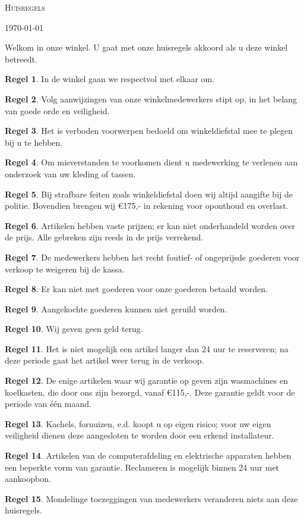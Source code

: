 \documentclass[a4paper,14pt]{extarticle}
\theoremstyle{definition}
\newtheorem{regel}{Regel}
\begin{document}
\thispagestyle{empty}
\centerline{\LARGE\textsc{Huisregels}}
\centerline{\today}
\vskip 1cm
Welkom in onze winkel. 
U gaat met onze huisregels akkoord als u deze winkel betreedt.
\begin{regel}
In de winkel gaan we respectvol met elkaar om.
\end{regel}
\begin{regel}
Volg aanwijzingen van onze winkelmedewerkers stipt op, in het belang van goede orde en veiligheid.
\end{regel}
\begin{regel}
Het is verboden voorwerpen bedoeld om winkeldiefstal mee te plegen bij u te hebben.
\end{regel}
\begin{regel}
Om misverstanden te voorkomen dient u medewerking te verlenen aan onderzoek van uw kleding of tassen.
\end{regel}
\begin{regel}
Bij strafbare feiten zoals winkeldiefstal doen wij altijd aangifte bij de politie. Bovendien brengen wij \euro 175,- in rekening voor oponthoud en overlast. 
\end{regel}
\begin{regel}
Artikelen hebben vaste prijzen; er kan niet onderhandeld worden over de prijs. Alle gebreken zijn reeds in de prijs verrekend.
\end{regel}
\begin{regel}
De medewerkers hebben het recht foutief- of ongeprijsde goederen voor verkoop te weigeren bij de kassa.
\end{regel}
\begin{regel}
Er kan niet met goederen voor onze goederen betaald worden.
\end{regel}
\begin{regel}
Aangekochte goederen kunnen niet geruild worden.
\end{regel}
\begin{regel}
Wij geven geen geld terug.
\end{regel}
\begin{regel}
Het is niet mogelijk een artikel langer dan 24 uur te reserveren; na deze periode gaat het artikel weer terug in de verkoop.
\end{regel}
\begin{regel}
De enige artikelen waar wij garantie op geven zijn wasmachines en koelkasten,  die door ons zijn bezorgd, vanaf \euro 115,-. Deze garantie geldt voor de periode van \'{e}\'{e}n maand. 
\end{regel}
\begin{regel}
Kachels, fornuizen, e.d. koopt u op eigen risico; voor uw eigen veiligheid dienen deze aangesloten te worden door een erkend installateur.
\end{regel}
\begin{regel}
Artikelen van de computerafdeling en elektrische apparaten hebben een beperkte vorm van garantie. Reclameren is mogelijk binnen 24 uur met aankoopbon.
\end{regel}
\begin{regel}
Mondelinge toezeggingen van medewerkers veranderen niets aan deze huisregels.
\end{regel}
\end{document}
